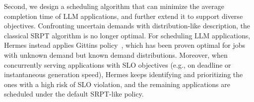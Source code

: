 Second, we design a scheduling algorithm that can minimize the average completion time of LLM applications, and further extend it to support diverse objectives. 
Confronting uncertain demands with distribution-like description, the classical SRPT algorithm is no longer optimal. 
For scheduling LLM applications, Hermes instead applies Gittins policy~\cite{aalto2009gittins, scully2021gittins}, which has been proven optimal for jobs with unknown demand but known demand distributions. 
Moreover, when concurrently serving applications with SLO objectives (e.g., on deadline or instantaneous generation speed), Hermes keeps identifying and prioritizing the ones with a high risk of SLO violation, and the remaining applications are scheduled under the default SRPT-like policy.

			
